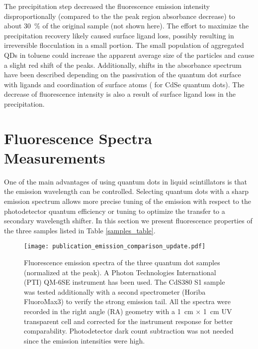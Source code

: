 \documentclass[cits]{JINST}
\begin{document}
The precipitation step decreased the fluorescence emission intensity disproportionally (compared to the the peak region absorbance decrease) to about 30~\% of the original sample (not shown here). The effort to maximize the precipitation recovery likely caused surface ligand loss, possibly resulting in irreversible flocculation in a small portion. The small population of aggregated QDs in toluene could increase the apparent average size of the particles and cause a slight red shift of the peaks. Additionally, shifts in the absorbance spectrum have been described depending on the passivation of the quantum dot surface with ligands and coordination of surface atoms (\cite{inerbaev} for CdSe quantum dots). The decrease of fluorescence intensity is also a result of surface ligand loss in the precipitation. 

\section{Fluorescence Spectra Measurements}\label{Fluorescence_section}
One of the main advantages of using quantum dots in liquid scintillators is that the emission wavelength can be controlled. Selecting quantum dots with a sharp emission spectrum allows more precise tuning of the emission with respect to the photodetector quantum efficiency or tuning to optimize the transfer to a secondary wavelength shifter. In this section we present fluorescence properties of the three samples listed in Table \ref{samples_table}. 

\begin{figure}
      \begin{center}
        \texttt{[image: publication\_emission\_comparison\_update.pdf]}
        \caption[]{Fluorescence emission spectra of the three quantum dot samples (normalized at the peak). A Photon Technologies International (PTI) QM-6SE instrument has been used. The CdS380 S1 sample was tested additionally with a second spectrometer (Horiba FluoroMax3) to verify the strong emission tail. All the spectra were recorded in the right angle (RA) geometry with a 1~cm $\times$ 1~cm UV transparent cell and corrected for the instrument response for better comparability. Photodetector dark count subtraction was not needed since the emission intensities were high. \label{emission_comp}}
        \end{center}
\end{figure}
\end{document}
